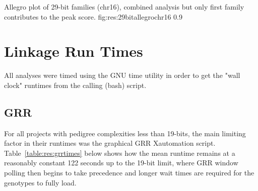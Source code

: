 	{Allegro plot of 29-bit families (chr16), combined analysis but only first family contributes to the peak score.}
	{fig:res:29bitallegrochr16}
	{0.9}


\section{Linkage Run Times}

All analyses were timed using the GNU time utility in order to get the "wall clock" runtimes from the calling (bash) script.

\subsection{GRR}
For all projects with pedigree complexities less than 19-bits, the main limiting factor in their runtimes was the graphical GRR Xautomation script. Table~\ref{table:res:grrtimes} below shows how the mean runtime  remains at a reasonably constant 122 seconds up to the 19-bit limit, where GRR window polling then begins to take precedence and longer wait times are required for the genotypes to fully load.


